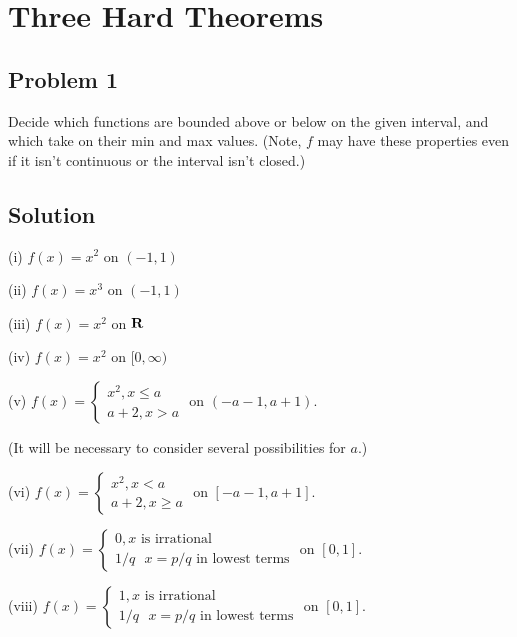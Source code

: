 \section{Three Hard Theorems}

\subsection*{Problem 1}
Decide which functions are bounded above or below on the given
interval, and which take on their min and max values. (Note, $f$ may
have these properties even if it isn't continuous or the interval
isn't closed.)

\subsection*{Solution}

(i) $f(x)=x^{2}$ on $(-1,1)$

\vs

(ii) $f(x)=x^{3}$ on $(-1,1)$

\vs

(iii) $f(x)=x^{2}$ on $\mathbf{R}$

\vs

(iv) $f(x)=x^{2}$ on $[0, \infty)$

\vs

(v) $f(x)=\begin{cases}
  x^{2}, x\leq a\\
  a+2, x>a
\end{cases}$ on $(-a-1, a+1)$.

(It will be necessary to consider several possibilities for $a$.)

\vs

(vi) $f(x)=\begin{cases}
  x^{2}, x<a\\
  a+2, x\geq a
\end{cases}$ on $[-a-1, a+1]$.

\vs

(vii) $f(x)=\begin{cases}
  0, \text{$x$ is irrational}\\
  1/q \ \ \ x=p/q \text{ in lowest terms}
\end{cases}$ on $[0, 1]$.

\vs

(viii) $f(x)=\begin{cases}
  1, \text{$x$ is irrational}\\
  1/q \ \ \ x=p/q \text{ in lowest terms}
\end{cases}$ on $[0, 1]$.

